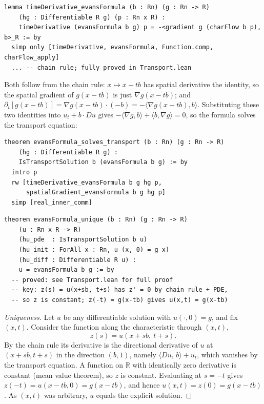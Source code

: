 ﻿\documentclass[12pt, a4paper]{article}
\renewcommand{\_}{\origunderscore\allowbreak}
\theoremstyle{definition}
\theoremstyle{plain}
\begin{document}
\begin{lstlisting}[caption={Time derivative equals minus inner product with b (proved)}]
lemma timeDerivative_evansFormula (b : Rn) (g : Rn -> R)
    (hg : Differentiable R g) (p : Rn x R) :
    timeDerivative (evansFormula b g) p = -<gradient g (charFlow b p), b>_R := by
  simp only [timeDerivative, evansFormula, Function.comp, charFlow_apply]
  ... -- chain rule; fully proved in Transport.lean
\end{lstlisting}

Both follow from the chain rule: $x \mapsto x - tb$ has spatial derivative the identity,
so the spatial gradient of $g(x-tb)$ is just $\nabla g(x-tb)$; and
$\partial_t[g(x-tb)] = \nabla g(x-tb) \cdot (-b) = -\langle \nabla g(x-tb), b \rangle$.
Substituting these two identities into $u_t + b\cdot Du$ gives
$-\langle\nabla g, b\rangle + \langle b, \nabla g\rangle = 0$, so the formula solves the
transport equation:

\begin{lstlisting}[caption={Existence (proved)}]
theorem evansFormula_solves_transport (b : Rn) (g : Rn -> R)
    (hg : Differentiable R g) :
    IsTransportSolution b (evansFormula b g) := by
  intro p
  rw [timeDerivative_evansFormula b g hg p,
      spatialGradient_evansFormula b g hg p]
  simp [real_inner_comm]
\end{lstlisting}

\begin{lstlisting}[caption={Uniqueness via characteristics (proved)}]
theorem evansFormula_unique (b : Rn) (g : Rn -> R)
    (u : Rn x R -> R)
    (hu_pde  : IsTransportSolution b u)
    (hu_init : ForAll x : Rn, u (x, 0) = g x)
    (hu_diff : Differentiable R u) :
    u = evansFormula b g := by
  -- proved: see Transport.lean for full proof
  -- key: z(s) = u(x+sb, t+s) has z' = 0 by chain rule + PDE,
  -- so z is constant; z(-t) = g(x-tb) gives u(x,t) = g(x-tb)
\end{lstlisting}

\begin{proof}[Uniqueness]
Let $u$ be any differentiable solution with $u(\cdot,0)=g$, and fix $(x,t)$. Consider the
function along the characteristic through $(x,t)$,
\[
  z(s) = u(x+sb,\ t+s).
\]
By the chain rule its derivative is the directional derivative of $u$ at $(x+sb,t+s)$ in the
direction $(b,1)$, namely $\langle Du,\,b\rangle + u_t$, which vanishes by the transport
equation. A function on $\mathbb{R}$ with identically zero derivative is constant (mean value
theorem), so $z$ is constant. Evaluating at $s=-t$ gives $z(-t) = u(x-tb,0) = g(x-tb)$, and
hence $u(x,t) = z(0) = g(x-tb)$. As $(x,t)$ was arbitrary, $u$ equals the explicit solution.
\end{proof}
\end{document}
